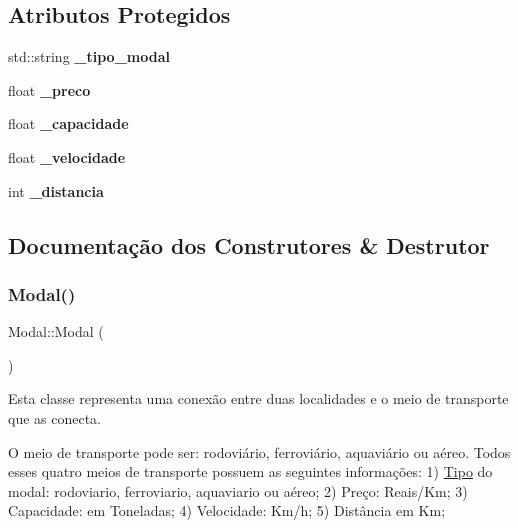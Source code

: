 \subsection*{Atributos Protegidos}
\begin{DoxyCompactItemize}
\item 
\mbox{\label{classModal_aef40834202f0fe655d4c1d3478a41d0f}} 
std\+::string {\bfseries \+\_\+tipo\+\_\+modal}
\item 
\mbox{\label{classModal_a487c4263e492750fbaac789e0e3feef3}} 
float {\bfseries \+\_\+preco}
\item 
\mbox{\label{classModal_a61a2da94d2f76fc7f761928d78d51196}} 
float {\bfseries \+\_\+capacidade}
\item 
\mbox{\label{classModal_adebafa0b04fbf2c065bb6ebcf84f1524}} 
float {\bfseries \+\_\+velocidade}
\item 
\mbox{\label{classModal_a39f95d6378c8794c91bca2efbbf11337}} 
int {\bfseries \+\_\+distancia}
\end{DoxyCompactItemize}


\subsection{Documentação dos Construtores \& Destrutor}
\mbox{\label{classModal_a8762a8d9f09cb6a2ec5f54f5d26412c0}} 
\subsubsection{\texorpdfstring{Modal()}{Modal()}\hspace{0.1cm}{\footnotesize\ttfamily [1/2]}}
{\footnotesize\ttfamily Modal\+::\+Modal (\begin{DoxyParamCaption}{ }\end{DoxyParamCaption})}



Esta classe representa uma conexão entre duas localidades e o meio de transporte que as conecta. 

O meio de transporte pode ser\+: rodoviário, ferroviário, aquaviário ou aéreo. Todos esses quatro meios de transporte possuem as seguintes informações\+: 1) \hyperlink{classTipo}{Tipo} do modal\+: rodoviario, ferroviario, aquaviario ou aéreo; 2) Preço\+: Reais/\+Km; 3) Capacidade\+: em Toneladas; 4) Velocidade\+: Km/h; 5) Distância em Km;

